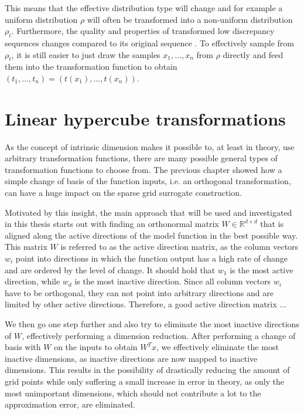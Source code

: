 \documentclass[
  a4paper,  %
  twoside,  %
  bibliography=totoc,
  headsepline,
  cleardoublepage=empty,
  parskip=half,
  draft=false
]{scrbook}
\begin{document}
This means that the effective distribution type will change and for example a uniform distribution $\rho$ will often be transformed into a non-uniform distribution $\rho_t$.
Furthermore, the quality and properties of transformed low discrepancy sequences changes compared to its original sequence \cite{}.
To effectively sample from $\rho_t$, it is still easier to just draw the samples $x_1, \dots, x_n$ from $\rho$ directly and feed them into the transformation function to obtain $(t_1, \dots, t_n)=(t(x_1), \dots, t(x_n))$.

\section{Linear hypercube transformations}

As the concept of intrinsic dimension makes it possible to, at least in theory, use arbitrary transformation functions, there are many possible general types of transformation functions to choose from.
The previous chapter showed how a simple change of basis of the function inputs, i.e. an orthogonal transformation, can have a huge impact on the sparse grid surrogate construction.

Motivated by this insight, the main approach that will be used and investigated in this thesis starts out with finding an orthonormal matrix $W \in \mathds{R}^{d \times d}$ that is aligned along the active directions of the model function in the best possible way.
This matrix $W$ is referred to as the active direction matrix, as the column vectors $w_i$ point into directions in which the function output has a high rate of change and are ordered by the level of change.
It should hold that $w_1$ is the most active direction, while $w_d$ is the most inactive direction.
Since all column vectors $w_i$ have to be orthogonal, they can not point into arbitrary directions and are limited by other active directions.
Therefore, a good active direction matrix ...

We then go one step further and also try to eliminate the most inactive directions of $W$, effectively performing a dimension reduction.
After performing a change of basis with $W$ on the inputs to obtain $W^T x$, we effectively eliminate the most inactive dimensions, as inactive directions are now mapped to inactive dimensions.
This results in the possibility of drastically reducing the amount of grid points while only suffering a small increase in error in theory, as only the most unimportant dimensions, which should not contribute a lot to the approximation error, are eliminated.
\end{document}
